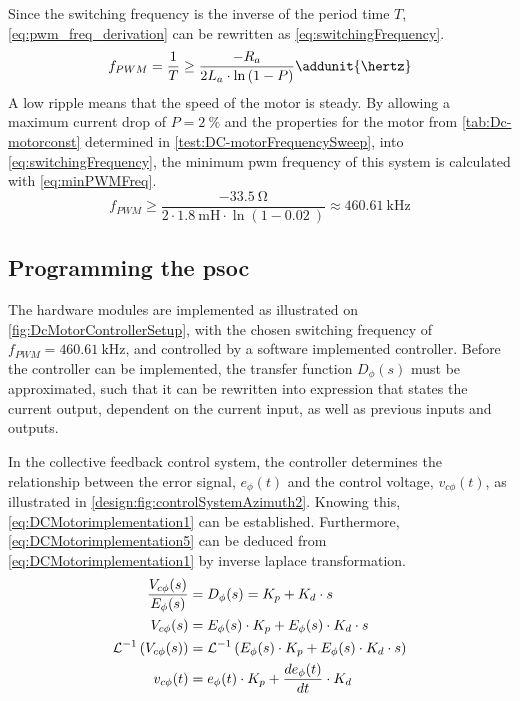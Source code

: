 Since the switching frequency is the inverse of the period time $T$, \autoref{eq:pwm_freq_derivation} can be rewritten as \autoref{eq:switchingFrequency}. 
\begin{equation} \label{eq:switchingFrequency}
	f_{PWM} = \frac{1}{T} \geq \frac{-R_a}{2 L_a \cdot \ln \left(1 - P\right)} \addunit{\hertz}
\end{equation}
A low ripple means that the speed of the motor is steady. By allowing a maximum current drop of $P = \SI{2}{\percent}$ and the properties for the motor from \autoref{tab:Dc-motorconst} determined in \autoref{test:DC-motorFrequencySweep}, into \autoref{eq:switchingFrequency}, the minimum \gls{pwm} frequency of this system is calculated with \autoref{eq:minPWMFreq}.
\begin{equation} \label{eq:minPWMFreq}
	f_{PWM} \geq \frac{-\SI{33,5}{\ohm}}{2 \cdot \SI{1,8}{\milli\henry} \cdot \ln \left(1- \SI{0.02}{}\right)} \approx \SI{460,61}{\kilo\hertz} 
\end{equation}

\subsection{Programming the \gls{psoc}}\label{sec:design:DCMotorPSoCProgramming}
The hardware modules are implemented as illustrated on \autoref{fig:DcMotorControllerSetup}, with the chosen switching frequency of $f_{PWM} = \SI{460.61}{\kilo\hertz}$, and controlled by a software implemented controller. Before the controller can be implemented, the transfer function $D_\phi (s)$ must be approximated, such that it can be rewritten into expression that states the current output, dependent on the current input, as well as previous inputs and outputs.

In the collective feedback control system, the controller determines the relationship between the error signal, $e_\phi(t)$ and the control voltage, $v_{c\phi}(t)$, as illustrated in \autoref{design:fig:controlSystemAzimuth2}. Knowing this, \autoref{eq:DCMotorimplementation1} can be established. Furthermore, \autoref{eq:DCMotorimplementation5} can be deduced from  \autoref{eq:DCMotorimplementation1} by inverse laplace transformation.
\begin{subequations}
\begin{align} 
\frac{V_{c \phi} (s)}{E_{\phi} (s)} &= D_\phi (s) = K_p + K_d \cdot s \label{eq:DCMotorimplementation1} \\
V_{c \phi} (s) &= E_{\phi} (s) \cdot K_p + E_{\phi} (s) \cdot K_d \cdot s \notag \\
\mathcal{L}^{-1}\left(V_{c \phi} (s)\right) &= \mathcal{L}^{-1}\left(E_{\phi} (s) \cdot K_p + E_{\phi} (s) \cdot K_d \cdot s \right)\notag\\
v_{c \phi} (t) &= e_{\phi} (t) \cdot K_p + \frac{d e_{\phi} (t)}{d t} \cdot K_d \label{eq:DCMotorimplementation5}
\end{align}
\end{subequations}

